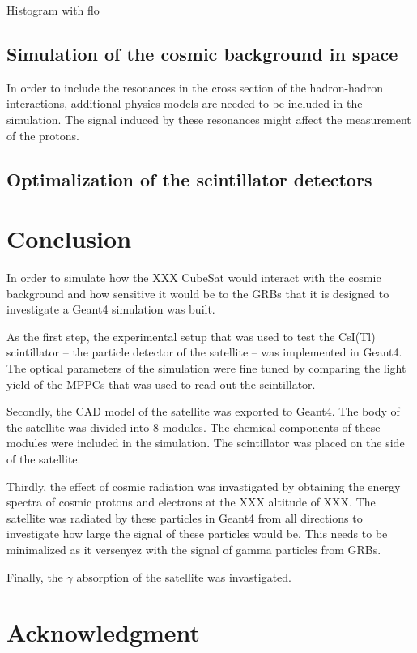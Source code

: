 \documentclass[12pt, a4paper,titlepage]{article}
\numberwithin{equation}{section}
\numberwithin{figure}{section}
\begin{document}
Histogram with flo

\subsection{Simulation of the cosmic background in space}

In order to include the resonances in the cross section of the hadron-hadron interactions, additional physics models are needed to be included in the simulation. The signal induced by these resonances might affect the measurement of the protons.
\subsection{Optimalization of the scintillator detectors}

\pagebreak
\section{Conclusion}

In order to simulate how the XXX CubeSat would interact with the cosmic background and how sensitive it would be to the GRBs that it is designed to investigate a Geant4 simulation was built.

As the first step, the experimental setup that was used to test the CsI(Tl) scintillator -- the particle detector of the satellite -- was implemented in Geant4. The optical parameters of the simulation were fine tuned by comparing the light yield of the MPPCs that was used to read out the scintillator.

Secondly, the CAD model of the satellite was exported to Geant4. The body of the satellite was divided into 8 modules. The chemical components of these modules were included in the simulation. The scintillator was placed on the side of the satellite.

Thirdly, the effect of cosmic radiation was invastigated by obtaining the energy spectra of cosmic protons and electrons at the XXX altitude of XXX. The satellite was radiated by these particles in Geant4 from all directions to investigate how large the signal of these particles would be. This needs to be minimalized as it versenyez with the signal of gamma particles from GRBs.

Finally, the $\gamma$ absorption of the satellite was invastigated.

\pagebreak

\section{Acknowledgment}
\end{document}
